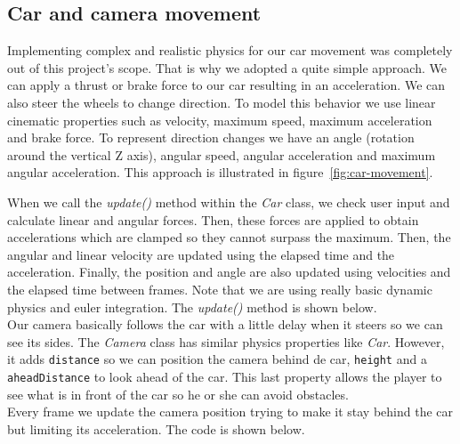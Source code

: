

\subsection{Car and camera movement}
\label{sec:imp-car}

Implementing complex and realistic physics for our car movement was completely out of
this project's scope. That is why we adopted a quite simple approach. We can apply
a thrust or brake force to our car resulting in an acceleration. We can also steer
the wheels to change direction. To model this behavior we use linear cinematic properties
such as velocity, maximum speed, maximum acceleration and brake force. To represent
direction changes we have an angle (rotation around the vertical Z axis), angular
speed, angular acceleration and maximum angular acceleration. This approach is illustrated
in figure~\ref{fig:car-movement}.\\


When we call the \textit{update()} method within the \textit{Car} class, we check
user input and calculate linear and angular forces. Then, these forces are applied
to obtain accelerations which are clamped so they cannot surpass the maximum. Then,
the angular and linear velocity are updated using the elapsed time and the acceleration.
Finally, the position and angle are also updated using velocities and the elapsed time
between frames. Note that we are using really basic dynamic physics and euler
integration. The \textit{update()} method is shown below.\\



Our camera basically follows the car with a little delay when it steers so we can
see its sides. The \textit{Camera} class has similar physics properties like \textit{Car}.
However, it adds \texttt{distance} so we can position the camera behind de car, \texttt{height}
and a \texttt{aheadDistance} to look ahead of the car. This last property allows the player
to see what is in front of the car so he or she can avoid obstacles.\\

Every frame we update the camera position trying to make it stay behind the car
but limiting its acceleration. The code is shown below.\\


